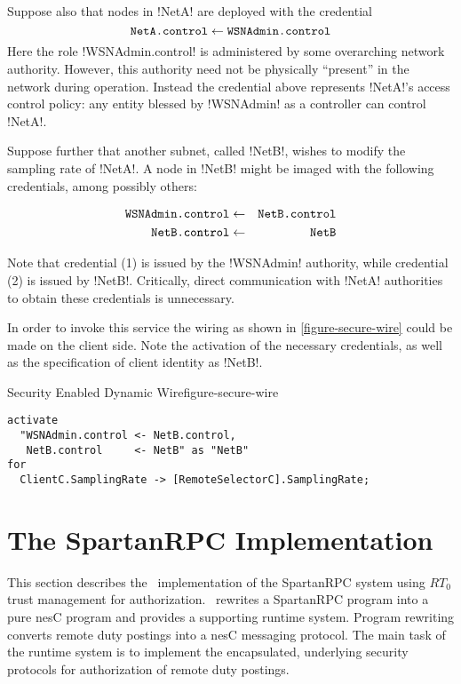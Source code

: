 Suppose also that nodes in !NetA! are deployed with the credential
\begin{displaymath}
\texttt{NetA.control} \leftarrow \texttt{WSNAdmin.control}
\end{displaymath}
Here the role !WSNAdmin.control! is administered by some overarching network authority. However,
this authority need not be physically ``present'' in the network during operation. Instead the
credential above represents !NetA!'s access control policy: any entity blessed by !WSNAdmin! as
a controller can control !NetA!.

Suppose further that another subnet, called !NetB!, wishes to modify the sampling rate of
!NetA!. A node in !NetB! might be imaged with the following credentials, among possibly others:

\singlespace
\begin{eqnarray}
\texttt{WSNAdmin.control} & \leftarrow & \texttt{NetB.control} \\
\texttt{NetB.control}     & \leftarrow & \texttt{NetB}
\end{eqnarray}
\primaryspacing

Note that credential (1) is issued by the !WSNAdmin! authority, while credential (2) is issued
by !NetB!. Critically, direct communication with !NetA! authorities to obtain these credentials
is unnecessary.

In order to invoke this service the wiring as shown in \autoref{figure-secure-wire} could be
made on the client side. Note the activation of the necessary credentials, as well as the
specification of client identity as !NetB!.

\begin{fpfig}[t]{Security Enabled Dynamic Wire}{figure-secure-wire}
{
\singlespace
\begin{lstlisting}
activate
  "WSNAdmin.control <- NetB.control, 
   NetB.control     <- NetB" as "NetB"
for 
  ClientC.SamplingRate -> [RemoteSelectorC].SamplingRate;
\end{lstlisting}
\primaryspacing
}
\end{fpfig}

\section{The SpartanRPC Implementation}
\label{section-implementation}

This section describes the \Sprocket\ implementation of the SpartanRPC system using $RT_0$
trust management for authorization. \Sprocket\ rewrites a SpartanRPC program into a pure nesC
program and provides a supporting runtime system. Program rewriting converts remote duty
postings into a nesC messaging protocol. The main task of the runtime system is to implement the
encapsulated, underlying security protocols for authorization of remote duty postings.

